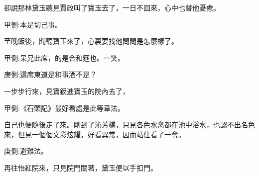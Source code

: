 \begin{parag}
    卻說那林黛玉聽見賈政叫了寶玉去了，一日不回來，心中也替他憂慮。\begin{note}甲側:本是切己事。\end{note}至晚飯後，聞聽寶玉來了，心裏要找他問問是怎麼樣了。\begin{note}甲側:呆兄此席，的是合和筵也。一笑。\end{note}\begin{note}庚側:這席東道是和事酒不是？\end{note}一步步行來，見寶釵進寶玉的院內去了，\begin{note}甲側:《石頭記》最好看處是此等章法。\end{note}自己也便隨後走了來。剛到了沁芳橋，只見各色水禽都在池中浴水，也認不出名色來，但見一個個文彩炫耀，好看異常，因而站住看了一會。\begin{note}庚側:避難法。\end{note}再往怡紅院來，只見院門關著，黛玉便以手扣門。
\end{parag}



